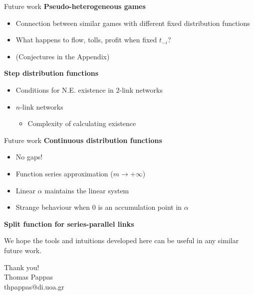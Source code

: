 \documentclass{beamer}
\begin{document}
\begin{frame}{Future work}
	\textbf{Pseudo-heterogeneous games}\pause
	\begin{itemize}
		\item Connection between similar games with different fixed distribution functions\pause
		\item What happens to flow, tolls, profit when fixed $t_{-i}$?\pause
		\item (Conjectures in the Appendix)
	\end{itemize}\pause

	\textbf{Step distribution functions}\pause
	\begin{itemize}
		\item Conditions for N.E. existence in $2$-link networks\pause
		\item $n$-link networks\pause
		\begin{itemize}
			\item Complexity of calculating existence
		\end{itemize}
	\end{itemize}
\end{frame}

\begin{frame}{Future work}
	\textbf{Continuous distribution functions}\pause
	\begin{itemize}
		\item No gaps!\pause
		\item Function series approximation ($m \rightarrow +\infty$)\pause
		\item Linear $\alpha$ maintains the linear system\pause
		\item Strange behaviour when $0$ is an accumulation point in $\alpha$
	\end{itemize}\pause

	\textbf{Split function for series-parallel links}\pause

	We hope the tools and intuitions developed here can be useful in any similar future work.
\end{frame}

\begin{frame}{}
	\centering
    \huge Thank you!\\
    \normalsize Thomas Pappas\\
    thpappas@di.uoa.gr
\end{frame}
\end{document}
